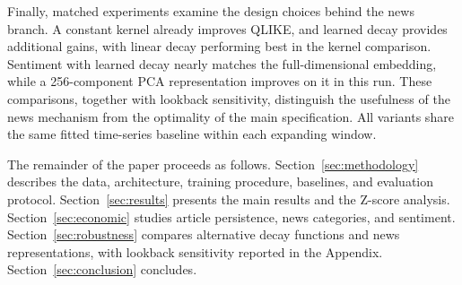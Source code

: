 Finally, matched experiments examine the design choices behind the
news branch. A constant kernel already improves QLIKE, and learned
decay provides additional gains, with linear decay performing best
in the kernel comparison. Sentiment with learned decay nearly
matches the full-dimensional embedding, while a 256-component PCA
representation improves on it in this run. These comparisons,
together with lookback sensitivity, distinguish the usefulness of
the news mechanism from the optimality of the main specification.
All variants share the same fitted time-series baseline within each
expanding window.

The remainder of the paper proceeds as follows.
Section~\ref{sec:methodology} describes the data, architecture,
training procedure, baselines, and evaluation protocol.
Section~\ref{sec:results} presents the main results and the Z-score
analysis. Section~\ref{sec:economic} studies article persistence, news
categories, and sentiment. Section~\ref{sec:robustness} compares
alternative decay functions and news representations, with lookback
sensitivity reported in the Appendix.
Section~\ref{sec:conclusion} concludes.
